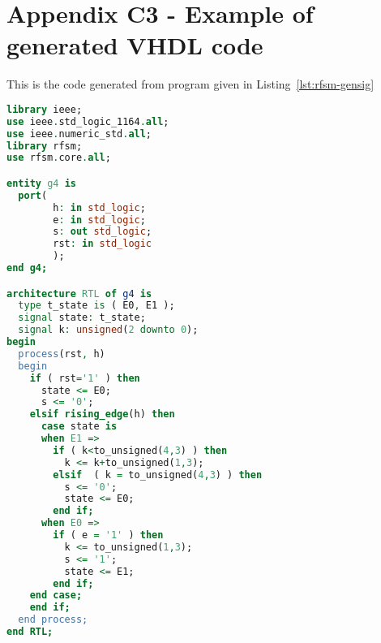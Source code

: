\chapter*{Appendix C3 - Example of generated VHDL code}  
\label{cha:ex1-vhdl}

This is the code generated from program given in Listing~\ref{lst:rfsm-gensig} 

\begin{lstlisting}[language=VHDL,frame=single,numbers=none,basicstyle=\small,caption=File g4.vhd]
library ieee;
use ieee.std_logic_1164.all;
use ieee.numeric_std.all;
library rfsm;
use rfsm.core.all;

entity g4 is
  port(
        h: in std_logic;
        e: in std_logic;
        s: out std_logic;
        rst: in std_logic
        );
end g4;

architecture RTL of g4 is
  type t_state is ( E0, E1 );
  signal state: t_state;
  signal k: unsigned(2 downto 0);
begin
  process(rst, h)
  begin
    if ( rst='1' ) then
      state <= E0;
      s <= '0';
    elsif rising_edge(h) then 
      case state is
      when E1 =>
        if ( k<to_unsigned(4,3) ) then
          k <= k+to_unsigned(1,3);
        elsif  ( k = to_unsigned(4,3) ) then
          s <= '0';
          state <= E0;
        end if;
      when E0 =>
        if ( e = '1' ) then
          k <= to_unsigned(1,3);
          s <= '1';
          state <= E1;
        end if;
    end case;
    end if;
  end process;
end RTL;
\end{lstlisting}

